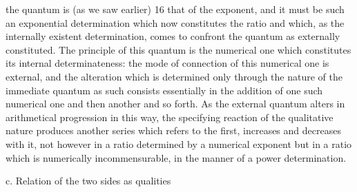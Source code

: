 the quantum is (as we saw earlier) 16 that of the exponent, and it must be such
an exponential determination which now constitutes the ratio and which,
as the internally existent determination, comes to confront the quantum as
externally constituted. The principle of this quantum is the numerical one
which constitutes its internal determinateness: the mode of connection of
this numerical one is external, and the alteration which is determined only
through the nature of the immediate quantum as such consists essentially
in the addition of one such numerical one and then another and so forth.
As the external quantum alters in arithmetical progression in this way, the
specifying reaction of the qualitative nature produces another series which
refers to the first, increases and decreases with it, not however in a ratio
determined by a numerical exponent but in a ratio which is numerically
incommensurable, in the manner of a power determination.

c. Relation of the two sides as qualities

